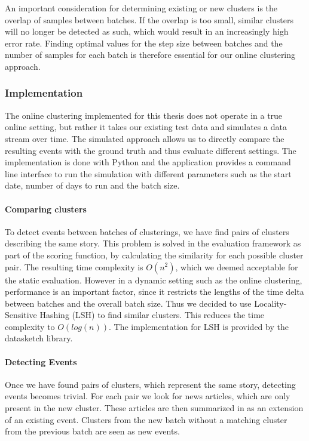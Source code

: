 An important consideration for determining existing or new clusters is the overlap of samples between batches. If the overlap is too small, similar clusters will no longer be detected as such, which would result in an increasingly high error rate. Finding optimal values for the step size between batches and the number of samples for each batch is therefore essential for our online clustering approach.

\subsubsection{Implementation}
\label{sec:online_clustering_implementation}

The online clustering implemented for this thesis does not operate in a true online setting, but rather it takes our existing test data and simulates a data stream over time. The simulated approach allows us to directly compare the resulting events with the ground truth and thus evaluate different settings. The implementation is done with Python and the application provides a command line interface to run the simulation with different parameters such as the start date, number of days to run and the batch size.

\paragraph{Comparing clusters}
To detect events between batches of clusterings,
we have find pairs of clusters describing the same story.
This problem is solved in the evaluation framework as part of the scoring function,
by calculating the similarity for each possible cluster pair.
The resulting time complexity is $O(n^2)$, which we deemed acceptable for the static evaluation.
However in a dynamic setting such as the online clustering, performance is an important factor,
since it restricts the lengths of the time delta between batches and the overall batch size.
Thus we decided to use Locality-Sensitive Hashing (LSH)\cite{alex2015practical} to find similar clusters.
This reduces the time complexity to $O(log(n))$.
The implementation for LSH is provided by the datasketch library\cite{eric_zhu_2017_290602}.

\paragraph{Detecting Events}
Once we have found pairs of clusters, which represent the same story, detecting events becomes trivial.
For each pair we look for news articles, which are only present in the new cluster.
These articles are then summarized in as an extension of an existing event.
Clusters from the new batch without a matching cluster from the previous batch
are seen as new events.

